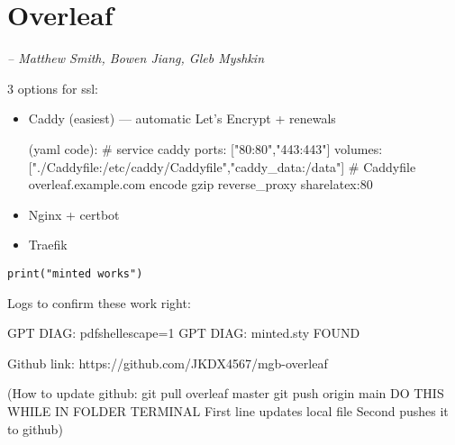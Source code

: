 \chapter{Overleaf}
\small{\textit{-- Matthew Smith, Bowen Jiang, Gleb Myshkin}}


3 options for ssl:

\begin{itemize}
        \item Caddy (easiest) — automatic Let’s Encrypt + renewals

        (yaml code): # service caddy
        ports: ["80:80","443:443"]
        volumes: ["./Caddyfile:/etc/caddy/Caddyfile","caddy_data:/data"]
        # Caddyfile
        overleaf.example.com {
          encode gzip
          reverse_proxy sharelatex:80
        }
        \item Nginx + certbot
        \item Traefik
    \end{itemize}

\begin{verbatim}
print("minted works")
\end{verbatim}


Logs to confirm these work right:

GPT DIAG: pdfshellescape=1
GPT DIAG: minted.sty FOUND



Github link: https://github.com/JKDX4567/mgb-overleaf

(How to update github: 
git pull overleaf master
git push origin main
DO THIS WHILE IN FOLDER TERMINAL
First line updates local file
Second pushes it to github)

